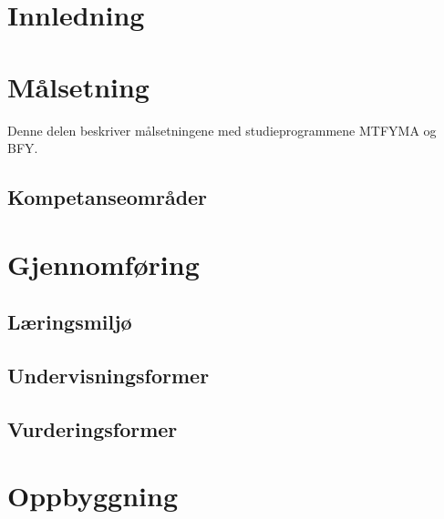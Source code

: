 \documentclass[a4paper, oneside, 12pt]{memoir}
\begin{document}
\frontmatter
\tableofcontents

\part{Innledning}

\mainmatter



\part{Målsetning}

Denne delen beskriver målsetningene med studieprogrammene MTFYMA og BFY.


\chapter{Kompetanseområder}


\part{Gjennomføring}

	\chapter{Læringsmiljø}
	
	\chapter{Undervisningsformer}
	
	\chapter{Vurderingsformer}

\part{Oppbyggning}

\appendix

\renewcommand{\appendixtocname}{Tillegg}
\renewcommand{\appendixpagename}{Tillegg}
\end{document}
